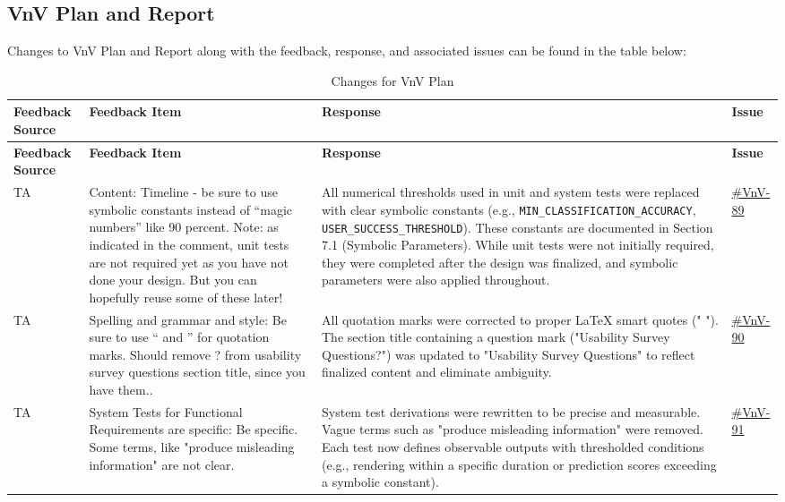 \documentclass{article}
\begin{document}
\subsection{VnV Plan and Report}
Changes to VnV Plan and Report along with the feedback, response, and associated issues can be
found in the table below:
\renewcommand{\arraystretch}{1.3}
\begin{longtable}{|p{1.48cm}|p{5cm}|p{4.7cm}|p{1cm}|}
\caption{Changes for VnV Plan} \\
\hline
\textbf{Feedback Source} & \textbf{Feedback Item} & \textbf{Response} & \textbf{Issue} \\
\hline
\endfirsthead

\hline
\textbf{Feedback Source} & \textbf{Feedback Item} & \textbf{Response} & \textbf{Issue} \\
\hline
\endhead

TA & Content: Timeline - be sure to use symbolic constants instead of ``magic numbers'' like 90 percent. Note: as indicated in the comment, unit tests are not required yet as you have not done your design. But you can hopefully reuse some of these later! & All numerical thresholds used in unit and system tests were replaced with clear symbolic constants (e.g., \texttt{MIN\_CLASSIFICATION\_ACCURACY}, \texttt{USER\_SUCCESS\_THRESHOLD}). These constants are documented in Section 7.1 (Symbolic Parameters). While unit tests were not initially required, they were completed after the design was finalized, and symbolic parameters were also applied throughout. & \href{https://github.com/harrisonchiu/xray/issues/89}{\#VnV-89} \\
\hline

TA & Spelling and grammar and style: Be sure to use `` and '' for quotation marks. Should remove ? from usability survey questions section title, since you have them.. & All quotation marks were corrected to proper LaTeX smart quotes (" "). The section title containing a question mark ("Usability Survey Questions?") was updated to "Usability Survey Questions" to reflect finalized content and eliminate ambiguity. &\href{https://github.com/harrisonchiu/xray/issues/90}{\#VnV-90}\\
\hline

TA & System Tests for Functional Requirements are specific: Be specific. Some terms, like "produce misleading information" are not clear. & System test derivations were rewritten to be precise and measurable. Vague terms such as "produce misleading information" were removed. Each test now defines observable outputs with thresholded conditions (e.g., rendering within a specific duration or prediction scores exceeding a symbolic constant).&\href{https://github.com/harrisonchiu/xray/issues/91}{\#VnV-91}\\
\hline


\end{longtable}
\end{document}
